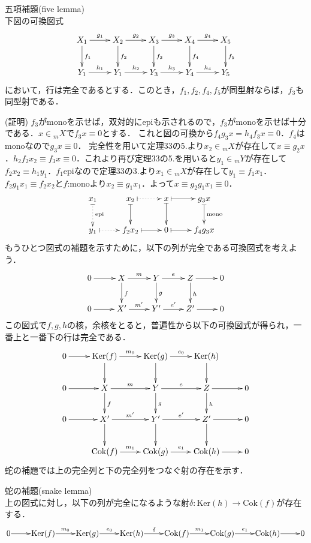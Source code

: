\begin{lem}五項補題(five lemma)\\
下図の可換図式
\[
\xymatrix{
X_1 \ar[d]^{f_1} \ar[r]^{g_1} & X_2 \ar[d]^{f_2} \ar[r]^{g_2} & X_3 \ar[d]^{f_3} \ar[r]^{g_3} & X_4 \ar[d]^{f_4} \ar[r]^{g_4} &
X_5 \ar[d]^{f_5}  \\
Y_1 \ar[r]^{h_1} & Y_1 \ar[r]^{h_2} & Y_3 \ar[r]^{h_3} & Y_4 \ar[r]^{h_4} & Y_5 
}
\]
において，行は完全であるとする．このとき，$f_1,f_2,f_4,f_5$が同型射ならば，$f_3$も同型射である．
\end{lem}
(証明)
$f_3$がmonoを示せば，双対的にepiも示されるので，$f_3$がmonoを示せば十分である．$x \in {}_mX$で$f_3x \equiv 0$とする．
これと図の可換から$f_4g_3x = h_4f_3x \equiv 0$．$f_4$はmonoなので$g_3x \equiv 0$．
完全性を用いて定理33の5.より$x_2 \in {}_mX$が存在して$x \equiv g_2x$．$h_2f_2x_2 \equiv f_3x \equiv 0 $．これより再び定理33の5.を用いると$y_1 \in {}_mY$が存在して$f_2x_2 \equiv h_1y_1$．$f_1$epiなので定理33の3.より$x_1\in {}_mX$が存在して$y_1 \equiv f_1x_1$．
$f_2g_1x_1 \equiv f_2x_2$と$f$:monoより$x_2 \equiv g_1x_1$．よって$x \equiv g_2g_1x_1 \equiv 0$．
\[
\xymatrix{
x_1\ar@{|.>}^{\mathrm{epi}}[d] & x_2 \ar@{|.>}[r] \ar@{|->}[d]&x \ar@{|->}[d] \ar@{|->}[r]& g_3x \ar@{|->}^{\mathrm{mono}}[d] \\
y_1 \ar@{|.>}[r]& f_2x_2 \ar@{|->}[r]& 0\ar@{|->}[r] & f_4g_3x
}
\]
\proofend
もうひとつ図式の補題を示すために，以下の列が完全である可換図式を考えよう．
\[
\xymatrix{
0 \ar[r] & X \ar[d]^f \ar[r]^m & Y \ar[d]^g \ar[r]^e & Z \ar[d]^h \ar[r] & 0 \\
0 \ar[r] & X' \ar[r]^{m'} &Y' \ar[r]^{e'} & Z' \ar[r] & 0 
}
\]
この図式で$f,g,h$の核，余核をとると，普遍性から以下の可換図式が得られ，一番上と一番下の行は完全である．
\[
\xymatrix{
0 \ar[r] & \mathrm{Ker}(f) \ar[d] \ar[r]^{m_0} &\mathrm{Ker}(g) \ar[d] \ar[r]^{e_0} & \mathrm{Ker}(h) \ar[d]   \\
0 \ar[r] & X \ar[d]^f \ar[r]^m & Y \ar[d]^g \ar[r]^e & Z \ar[d]^h \ar[r] & 0 \\
0 \ar[r] & X' \ar[d] \ar[r]^{m'} &Y' \ar[d] \ar[r]^{e'} & Z' \ar[d] \ar[r] & 0 \\
& \mathrm{Cok}(f) \ar[r]^{m_1} &\mathrm{Cok}(g) \ar[r]^{e_1} & \mathrm{Cok}(h) \ar[r] & 0  \\
}
\]
蛇の補題では上の完全列と下の完全列をつなぐ射の存在を示す．
\begin{lem}蛇の補題(snake lemma)\\
上の図式に対し，以下の列が完全になるような射$\delta:\mathrm{Ker}(h) \to \mathrm{Cok}(f)$が存在する．
\[
\xymatrix@1{
0 \ar[r] & \mathrm{Ker}(f)  \ar[r]^{m_0} &\mathrm{Ker}(g) \ar[r]^{e_0} & \mathrm{Ker}(h) \ar[r]^{\delta}
 & \mathrm{Cok}(f) \ar[r]^{m_1} &\mathrm{Cok}(g) \ar[r]^{e_1} & \mathrm{Cok}(h) \ar[r] & 0
}
\]
\end{lem}
